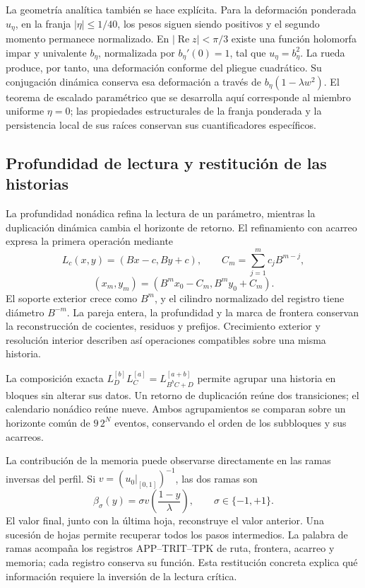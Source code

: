 La geometría analítica también se hace explícita. Para la deformación
ponderada \(u_\eta\), en la franja \(|\eta|\le1/40\), los pesos siguen siendo
positivos y el segundo momento permanece normalizado. En
\(|\operatorname{Re}z|<\pi/3\) existe una función holomorfa impar y univalente
\(b_\eta\), normalizada por \(b_\eta'(0)=1\), tal que
\(u_\eta=b_\eta^2\). La rueda produce, por tanto, una deformación conforme
del pliegue cuadrático. Su conjugación dinámica conserva esa deformación a
través de \(b_\eta(1-\lambda w^2)\). El teorema de escalado paramétrico que
se desarrolla aquí corresponde al miembro uniforme \(\eta=0\); las
propiedades estructurales de la franja ponderada y la persistencia local de
sus raíces conservan sus cuantificadores específicos.

\subsection{Profundidad de lectura y restitución de las historias}

La profundidad nonádica refina la lectura de un parámetro, mientras la
duplicación dinámica cambia el horizonte de retorno. El refinamiento con
acarreo expresa la primera operación mediante
\[
L_c(x,y)=(Bx-c,By+c),\qquad
C_m=\sum_{j=1}^m c_jB^{m-j},
\]
\[
(x_m,y_m)=(B^mx_0-C_m,B^my_0+C_m).
\]
El soporte exterior crece como \(B^m\), y el cilindro normalizado del registro
tiene diámetro \(B^{-m}\). La pareja entera, la profundidad y la marca de
frontera conservan la reconstrucción de cocientes, residuos y prefijos.
Crecimiento exterior y resolución interior describen así operaciones
compatibles sobre una misma historia.

La composición exacta
\(L_D^{[b]}L_C^{[a]}=L_{B^bC+D}^{[a+b]}\) permite agrupar una historia en
bloques sin alterar sus datos. Un retorno de duplicación reúne dos
transiciones; el calendario nonádico reúne nueve. Ambos agrupamientos se
comparan sobre un horizonte común de \(9\,2^N\) eventos, conservando el
orden de los subbloques y sus acarreos.

La contribución de la memoria puede observarse directamente en las ramas
inversas del perfil. Si \(v=(u_0|_{[0,1]})^{-1}\), las dos ramas son
\[
\beta_\sigma(y)=\sigma v\!\left(\frac{1-y}{\lambda}\right),
\qquad \sigma\in\{-1,+1\}.
\]
El valor final, junto con la última hoja, reconstruye el valor anterior. Una
sucesión de hojas permite recuperar todos los pasos intermedios. La palabra
de ramas acompaña los registros APP--TRIT--TPK de ruta, frontera, acarreo y
memoria; cada registro conserva su función. Esta restitución concreta
explica qué información requiere la inversión de la lectura crítica.

